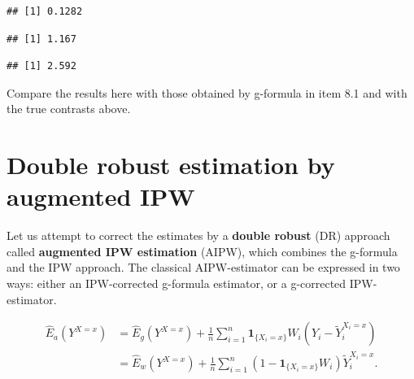 \documentclass[
]{book}
\newenvironment{Shaded}{\begin{snugshade}}{\end{snugshade}}
\newcommand{\AttributeTok}[1]{\textcolor[rgb]{0.13,0.29,0.53}{#1}}
\newcommand{\DecValTok}[1]{\textcolor[rgb]{0.00,0.00,0.81}{#1}}
\newcommand{\FunctionTok}[1]{\textcolor[rgb]{0.13,0.29,0.53}{\textbf{#1}}}
\newcommand{\NormalTok}[1]{#1}
\newcommand{\SpecialCharTok}[1]{\textcolor[rgb]{0.81,0.36,0.00}{\textbf{#1}}}
\newcommand{\StringTok}[1]{\textcolor[rgb]{0.31,0.60,0.02}{#1}}
\begin{document}
\begin{verbatim}
## [1] 0.1282
\end{verbatim}

\begin{Shaded}
\end{Shaded}

\begin{verbatim}
## [1] 1.167
\end{verbatim}

\begin{Shaded}
\end{Shaded}

\begin{verbatim}
## [1] 2.592
\end{verbatim}

Compare the results here with those obtained by
g-formula in item 8.1
and with the true contrasts above.

\section{Double robust estimation by augmented IPW}\label{double-robust-estimation-by-augmented-ipw}

Let us attempt to correct the estimates by a \textbf{double
robust} (DR) approach
called \textbf{augmented IPW estimation} (AIPW), which
combines the g-formula and
the IPW approach. The classical
AIPW-estimator can be expressed in two ways:
either an IPW-corrected g-formula estimator, or a g-corrected
IPW-estimator.

\[
\begin{aligned}
 \widehat{E}_a(Y^{X=x}) 
       & = \widehat{E}_g(Y^{X=x}) +
\frac{1}{n} \sum_{i=1}^n  {\mathbf 1}_{\{X_i=x\}} W_i 
                   ( Y_i - \widetilde{Y}_i^{X_i=x} )   \\
       & = \widehat{E}_w(Y^{X=x}) +
\frac{1}{n} \sum_{i=1}^n ( 1 - {\mathbf 1}_{\{X_i=x\}} W_i ) 
                      \widetilde{Y}_i^{X_i=x}.
\end{aligned}
\]
\end{document}
